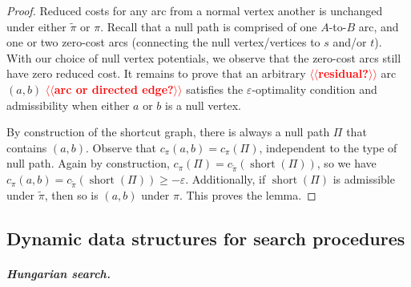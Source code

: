 \documentclass[a4paper,UKenglish]{socg-lipics-v2018}
\makeatletter
\def\note#1{\textcolor{red}{{#1}}}
\def\eps{\varepsilon}
\def\short{\operatorname{short}}
\theoremstyle{plain}
\numberwithin{figure}{section}
\renewcommand{\paragraph}{\subparagraph}
\def\n@te#1{\textsf{\boldmath \textbf{$\langle\!\langle$#1$\rangle\!\rangle$}}\leavevmode}
\def\note#1{\textcolor{red}{\n@te{#1}}}
\makeatother
\begin{document}
\begin{proof}
Reduced costs for any arc from a normal vertex another is unchanged under either
$\tilde{\pi}$ or $\pi$.
Recall that a null path is comprised of one $A$-to-$B$ arc, and one or two
zero-cost arcs (connecting the null vertex/vertices to $s$ and/or $t$).
With our choice of null vertex potentials, we observe that the zero-cost arcs
still have zero reduced cost.
It remains to prove that an arbitrary \note{residual?} arc $(a, b)$ \note{arc or directed edge?} satisfies the $\eps$-optimality condition and admissibility when either $a$ or $b$ is a null vertex.

By construction of the shortcut graph,
there is always a null path $\Pi$ that contains $(a, b)$.
Observe that $c_\pi(a, b) = c_\pi(\Pi)$, independent to the type of null path.
Again by construction, $c_\pi(\Pi) = c_{\tilde{\pi}}(\short(\Pi))$, so we have
$c_\pi(a, b) = c_{\tilde{\pi}}(\short(\Pi)) \geq -\eps$.
Additionally, if $\short(\Pi)$ is admissible under $\tilde{\pi}$, then so is
$(a, b)$ under $\pi$.
%
This proves the lemma.
\end{proof}


\subsection{Dynamic data structures for search procedures}

\paragraph{Hungarian search.}
\end{document}
